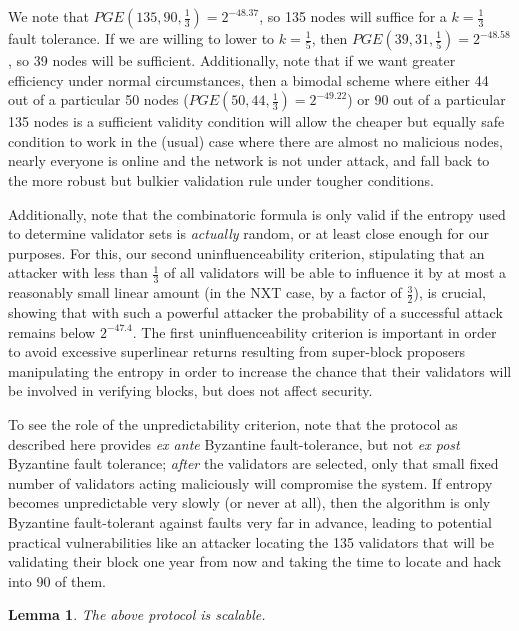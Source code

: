\documentclass[11pt,a4paper]{report}
\theoremstyle{plain}
\newtheorem{lem}[thm]{Lemma}
\theoremstyle{definition}
\theoremstyle{remark}
\begin{document}
We note that $PGE(135, 90, \frac{1}{3}) = 2^{-48.37}$, so 135 nodes will suffice for a $k = \frac{1}{3}$ fault tolerance. If we are willing to lower to $k = \frac{1}{5}$, then $PGE(39, 31, \frac{1}{5}) = 2^{-48.58}$, so 39 nodes will be sufficient. Additionally, note that if we want greater efficiency under normal circumstances, then a bimodal scheme where either 44 out of a particular 50 nodes ($PGE(50, 44, \frac{1}{3}) = 2^{-49.22}$) or 90 out of a particular 135 nodes is a sufficient validity condition will allow the cheaper but equally safe condition to work in the (usual) case where there are almost no malicious nodes, nearly everyone is online and the network is not under attack, and fall back to the more robust but bulkier validation rule under tougher conditions.

Additionally, note that the combinatoric formula is only valid if the entropy used to determine validator sets is \emph{actually} random, or at least close enough for our purposes. For this, our second uninfluenceability criterion, stipulating that an attacker with less than $\frac{1}{3}$ of all validators will be able to influence it by at most a reasonably small linear amount (in the NXT case, by a factor of $\frac{3}{2}$), is crucial, showing that with such a powerful attacker the probability of a successful attack remains below $2^{-47.4}$. The first uninfluenceability criterion is important in order to avoid excessive superlinear returns resulting from super-block proposers manipulating the entropy in order to increase the chance that their validators will be involved in verifying blocks, but does not affect security.

To see the role of the unpredictability criterion, note that the protocol as described here provides \emph{ex ante} Byzantine fault-tolerance, but not \emph{ex post} Byzantine fault tolerance; \emph{after} the validators are selected, only that small fixed number of validators acting maliciously will compromise the system. If entropy becomes unpredictable very slowly (or never at all), then the algorithm is only Byzantine fault-tolerant against faults very far in advance, leading to potential practical vulnerabilities like an attacker locating the 135 validators that will be validating their block one year from now and taking the time to locate and hack into 90 of them.

\begin{lem}
The above protocol is scalable.
\end{lem}
\end{document}
